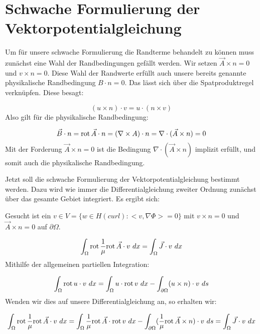 \section{Schwache Formulierung der Vektorpotentialgleichung}
Um f\"ur unsere schwache Formulierung die Randterme behandelt zu k\"onnen muss zun\"achst eine Wahl der Randbedingungen gef\"allt werden. Wir setzen $\vec{A}\times n = 0$ und $v\times n = 0$. Diese Wahl der Randwerte erf\"ullt auch unsere bereits genannte physikalische Randbedingung $B\cdot n = 0$. Das l\"asst sich \"uber die Spatproduktregel verkn\"upfen. Diese besagt:
\par
\begin{equation}
	(u \times n)\cdot v = u\cdot (n\times v)
\end{equation}
Also gilt f\"ur die physikalische Randbedingung:
\par
\begin{equation}
	\vec{B}\cdot n = \mathrm{rot}\,\vec{A}\cdot n = (\nabla\times A) \cdot n = \nabla \cdot (\vec{A}\times n) = 0
\end{equation}
Mit der Forderung $\vec{A}\times n = 0$ ist die Bedingung $\nabla \cdot (\vec{A}\times n)$ implizit erf\"ullt, und somit auch die physikalische Randbedingung.
\par
Jetzt soll die schwache Formulierung der Vektorpotentialgleichung bestimmt werden. Dazu wird wie immer die Differentialgleichung zweiter Ordnung zun\"achst \"uber das gesamte Gebiet integriert. Es ergibt sich: \par
Gesucht ist ein $v\in V = \{w \in H(curl): <v,\nabla\Phi> = 0\}$ mit $v\times n = 0$ und $\vec{A}\times n = 0$ auf $\partial\Omega$. 
\par
\begin{equation}
	\int_\Omega \mathrm{rot}\,\frac{1}{\mu}\mathrm{rot}\, \vec{A}\cdot v ~dx = \int_\Omega \vec{J}\cdot v ~dx 
\end{equation}
Mithilfe der allgemeinen partiellen Integration:
\par
\begin{equation}
	\int_\Omega \mathrm{rot}\, u\cdot v ~dx = \int_\Omega u \cdot \mathrm{rot}\, v ~dx - \int_{\partial\Omega} (u \times n)\cdot v ~ds
\end{equation}
Wenden wir dies auf unsere Differentialgleichung an, so erhalten wir:
\par
\begin{equation}
	\int_\Omega \mathrm{rot}\,\frac{1}{\mu}\mathrm{rot}\, \vec{A}\cdot v ~dx = \int_\Omega \frac{1}{\mu}\mathrm{rot}\, \vec{A} \cdot \mathrm{rot}\, v ~dx - \int_{\partial\Omega} (\frac{1}{\mu} \mathrm{rot}\, \vec{A} \times n)\cdot v ~ds = \int_\Omega \vec{J}\cdot v ~dx
\end{equation}
